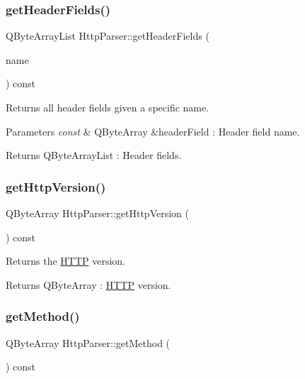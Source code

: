 \subsubsection{\texorpdfstring{get\+Header\+Fields()}{getHeaderFields()}}
{\footnotesize\ttfamily Q\+Byte\+Array\+List Http\+Parser\+::get\+Header\+Fields (\begin{DoxyParamCaption}\item[{const Q\+Byte\+Array \&}]{name }\end{DoxyParamCaption}) const}



Returns all header fields given a specific name. 


\begin{DoxyParams}{Parameters}
{\em const} & Q\+Byte\+Array \&header\+Field \+: Header field name. \\
\hline
\end{DoxyParams}
\begin{DoxyReturn}{Returns}
Q\+Byte\+Array\+List \+: Header fields. 
\end{DoxyReturn}
\mbox{\label{class_http_parser_a760eb9ec81fa1983b8eb5b088b0e6f41}} 
\subsubsection{\texorpdfstring{get\+Http\+Version()}{getHttpVersion()}}
{\footnotesize\ttfamily Q\+Byte\+Array Http\+Parser\+::get\+Http\+Version (\begin{DoxyParamCaption}{ }\end{DoxyParamCaption}) const}



Returns the \hyperlink{namespace_h_t_t_p}{H\+T\+TP} version. 

\begin{DoxyReturn}{Returns}
Q\+Byte\+Array \+: \hyperlink{namespace_h_t_t_p}{H\+T\+TP} version. 
\end{DoxyReturn}
\mbox{\label{class_http_parser_a283aa2b313491a592babdb5528086f71}} 
\subsubsection{\texorpdfstring{get\+Method()}{getMethod()}}
{\footnotesize\ttfamily Q\+Byte\+Array Http\+Parser\+::get\+Method (\begin{DoxyParamCaption}{ }\end{DoxyParamCaption}) const}



